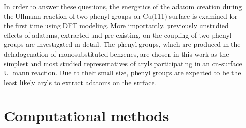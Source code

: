 \documentclass[%
 reprint,
 amsmath,amssymb,
 aps,
prb,
floatfix,
]{revtex4-2}
\newcommand{\lock}{\color{red}}
\newcommand{\lock}{\color{black}}
\begin{document}
\fi

{\lock

In order to answer these questions, the energetics of the adatom creation during the Ullmann reaction of two phenyl groups on Cu(111) surface is examined for the first time using DFT modeling. 
More importantly, previously unstudied effects of adatoms, extracted and pre-existing, on the coupling of two phenyl groups are investigated in detail. 
The phenyl groups, which are produced in the dehalogenation of monosubstituted benzenes, are chosen in this work as the simplest and most studied representatives of aryls participating in an on-surface Ullmann reaction. Due to their small size, phenyl groups are expected to be the least likely aryls to extract adatoms on the surface.




}

\section{Computational methods}
\end{document}
